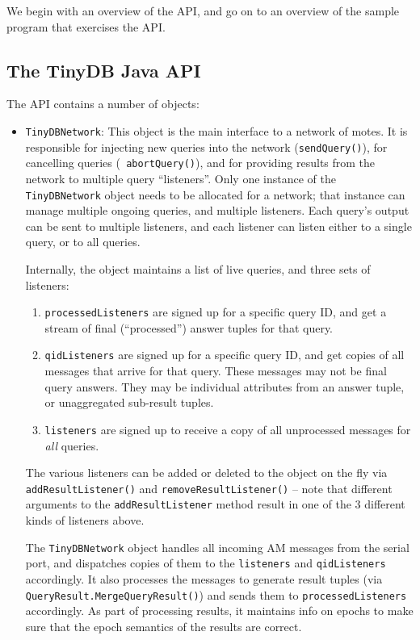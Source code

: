 \documentclass[11pt]{article}
\begin{document}
We begin with an overview of the API, and go on to an overview of the
sample program that exercises the API.

\subsection{The TinyDB Java API}
The API contains a number of objects:
\begin{itemize}
\item {\tt TinyDBNetwork}: This object is the main interface to a
  network of motes.  It is responsible for injecting new queries into
  the network ({\tt sendQuery()}), for cancelling queries ({\tt
  abortQuery()}), and for providing results from the network to
  multiple query ``listeners''.  Only one instance of the {\tt
  TinyDBNetwork} object needs to be allocated for a network; that
  instance can manage multiple ongoing queries, and multiple
  listeners.  Each query's output can be sent to multiple listeners,
  and each listener can listen either to a single query, or to all
  queries.
  
  Internally, the object maintains a list of live queries, and three
  sets of listeners:
  \begin{enumerate}
	\item {\tt processedListeners} are signed up for a specific query
    ID, and get a stream of final (``processed'') answer tuples for
    that query.
	\item {\tt qidListeners} are signed up for a specific query ID,
    and get copies of all messages that arrive for that query.  These
    messages may not be final query answers.  They may be individual
    attributes from an answer tuple, or unaggregated sub-result
    tuples.
	\item  {\tt listeners} are signed up to receive a copy of all
    unprocessed messages for {\em all} queries.  
  \end{enumerate}
  The various listeners can be added or deleted to the object on the
  fly via {\tt addResultListener()} and {\tt removeResultListener()}
  -- note that different arguments to the {\tt addResultListener}
  method result in one of the 3 different kinds of listeners above.

  The {\tt TinyDBNetwork} object handles all incoming
  AM messages from the
  serial port, and dispatches copies of them to the {\tt listeners}
  and {\tt qidListeners} accordingly.  It also processes the messages
  to generate result tuples (via {\tt QueryResult.MergeQueryResult()})
  and sends them to {\tt processedListeners} accordingly.  As part of
  processing results, it maintains info on epochs to make sure that
  the epoch semantics of the results are correct.


\end{itemize}
\end{document}
